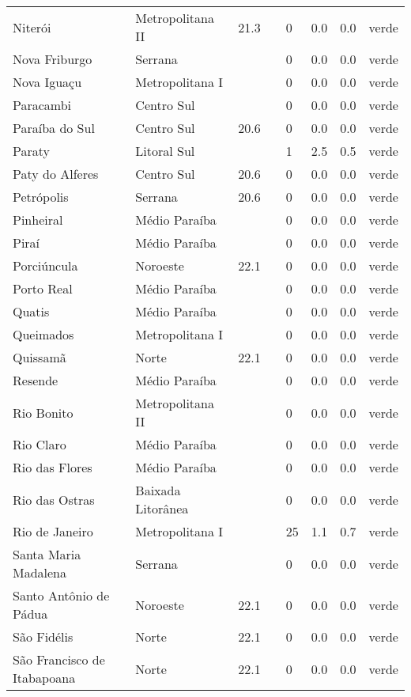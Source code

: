 \begin{longtable}{l|lllllll}
  Niterói & Metropolitana II & 21.3 &  & 0 & 0.0 & 0.0 & verde \\ 
  Nova Friburgo & Serrana &  &  & 0 & 0.0 & 0.0 & verde \\ 
  Nova Iguaçu & Metropolitana I &  &  & 0 & 0.0 & 0.0 & verde \\ 
  Paracambi & Centro Sul &  &  & 0 & 0.0 & 0.0 & verde \\ 
  Paraíba do Sul & Centro Sul & 20.6 &  & 0 & 0.0 & 0.0 & verde \\ 
  Paraty & Litoral Sul &  &  & 1 & 2.5 & 0.5 & verde \\ 
  Paty do Alferes & Centro Sul & 20.6 &  & 0 & 0.0 & 0.0 & verde \\ 
  Petrópolis & Serrana & 20.6 &  & 0 & 0.0 & 0.0 & verde \\ 
  Pinheiral & Médio Paraíba &  &  & 0 & 0.0 & 0.0 & verde \\ 
  Piraí & Médio Paraíba &  &  & 0 & 0.0 & 0.0 & verde \\ 
  Porciúncula & Noroeste & 22.1 &  & 0 & 0.0 & 0.0 & verde \\ 
  Porto Real & Médio Paraíba &  &  & 0 & 0.0 & 0.0 & verde \\ 
  Quatis & Médio Paraíba &  &  & 0 & 0.0 & 0.0 & verde \\ 
  Queimados & Metropolitana I &  &  & 0 & 0.0 & 0.0 & verde \\ 
  Quissamã & Norte & 22.1 &  & 0 & 0.0 & 0.0 & verde \\ 
  Resende & Médio Paraíba &  &  & 0 & 0.0 & 0.0 & verde \\ 
  Rio Bonito & Metropolitana II &  &  & 0 & 0.0 & 0.0 & verde \\ 
  Rio Claro & Médio Paraíba &  &  & 0 & 0.0 & 0.0 & verde \\ 
  Rio das Flores & Médio Paraíba &  &  & 0 & 0.0 & 0.0 & verde \\ 
  Rio das Ostras & Baixada Litorânea &  &  & 0 & 0.0 & 0.0 & verde \\ 
  Rio de Janeiro & Metropolitana I &  &  & 25 & 1.1 & 0.7 & verde \\ 
  Santa Maria Madalena & Serrana &  &  & 0 & 0.0 & 0.0 & verde \\ 
  Santo Antônio de Pádua & Noroeste & 22.1 &  & 0 & 0.0 & 0.0 & verde \\ 
  São Fidélis & Norte & 22.1 &  & 0 & 0.0 & 0.0 & verde \\ 
  São Francisco de Itabapoana & Norte & 22.1 &  & 0 & 0.0 & 0.0 & verde \\ 

\end{longtable}
